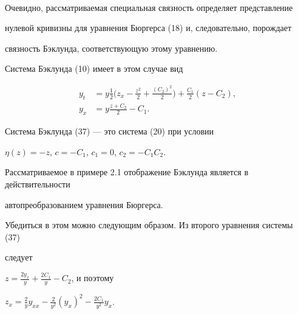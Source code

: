 \begin{exams}
\begin{align*}
\end{align*} 


Очевидно, рассматриваемая специальная связность определяет представление 


нулевой кривизны для уравнения Бюргерса (18) и, следовательно, порождает 


связность Бэклунда, соответствующую этому уравнению.


Система Бэклунда (10) имеет в этом случае вид


\begin{equation}


\begin{split}


y_t&=y \frac{1}{2} \bigg({z_x-\frac{{z^2}}{2}+


\frac{{({C_2})^2}}{2}}\bigg)+\frac{{C_1}}{2} ({z-C_2}), \\


y_x&=y \frac{{z+C_2}}{2}-C_1. 


\end{split} 


\end{equation}


\end{exams}





\begin{notes}


Система Бэклунда {(37)} --- это система {(20)} при условии


$\eta (z)=- z$, $c=- C_1$, $c_1=0$, $c_2=- C_1 C_2$.


\end{notes}





\begin{notes}


Рассматриваемое в примере 2.1 отображение Бэклунда является в действительности


автопреобразованием уравнения Бюргерса.


\end{notes}





Убедиться в этом можно следующим образом. Из второго уравнения системы (37) 


следует


$z=\frac{{2y_x}}{y}+\frac{{2C_1}}{y}-C_2$, и поэтому


$z_x=\frac{2}{y}y_{xx}-\frac{2}{{y^2}} ({y_x})^2-\frac{{2C_1}}{{y^2}}y_x$.


